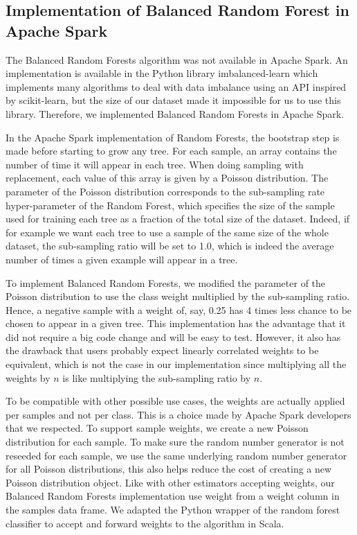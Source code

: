 \documentclass[conference]{IEEEtran}
\begin{document}
\subsection{Implementation of Balanced Random Forest in Apache Spark}

The Balanced Random Forests algorithm was not available in Apache Spark.
An implementation is available in the Python library
imbalanced-learn\cite{imbalance} which implements many algorithms to deal
with data imbalance using an API inspired by scikit-learn, but the size of
our dataset made it impossible for us to use this library. Therefore, we
implemented Balanced Random Forests in Apache Spark.

In the Apache Spark implementation of Random Forests, the bootstrap step is
made before starting to grow any tree. For each sample, an array contains
the number of time it will appear in each tree. When doing sampling with
replacement, each value of this array is given by a Poisson distribution.
The parameter of the Poisson distribution corresponds to the sub-sampling
rate hyper-parameter of the Random Forest, which specifies the size of the
sample used for training each tree as a fraction of the total size of the
dataset. Indeed, if for example we want each tree to use a sample of the
same size of the whole dataset, the sub-sampling ratio will be set to 1.0,
which is indeed the average number of times a given example will appear in a tree.

To implement Balanced Random Forests, we modified the parameter of
the Poisson distribution to use the class weight multiplied by the
sub-sampling ratio. Hence, a negative sample with a weight
of, say, 0.25 has 4 times less chance to be chosen to appear in a given tree. This
implementation has the advantage that it did not require a big code change
and will be easy to test. However, it also has the drawback that users probably
expect linearly correlated weights to be equivalent, which is not the case
in our implementation since multiplying all the weights by $n$ is like multiplying
the sub-sampling ratio by $n$.

To be compatible with other possible use cases, the weights are
actually applied per samples and not per class. This is a choice made by
Apache Spark developers that we respected. To support sample
weights, we create a new Poisson distribution for each sample. To make sure
the random number generator is not reseeded for each sample, we use the
same underlying random number generator for all Poisson distributions, this
also helps reduce the cost of creating a new Poisson distribution object.
Like with other estimators accepting weights, our Balanced Random Forests
implementation use weight from a weight column in the samples data frame.
We adapted the Python wrapper of the random forest classifier to accept and
forward weights to the algorithm in Scala.
\end{document}
